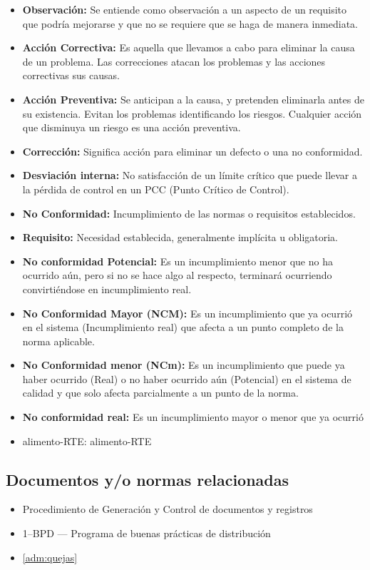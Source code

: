\begin{itemize}
	\item \textbf{Observación:} Se entiende como observación a un aspecto de un requisito que podría mejorarse y que no se requiere que se haga de manera inmediata.
	\item \textbf{Acción Correctiva:} Es aquella que llevamos a cabo para eliminar la causa de un problema. Las correcciones atacan los problemas y las acciones correctivas sus causas.
	\item \textbf{Acción Preventiva:} Se anticipan a la causa, y pretenden eliminarla antes de su existencia. Evitan los problemas identificando los riesgos. Cualquier acción que disminuya un riesgo es una acción preventiva.
	\item \textbf{Corrección:} Significa acción para eliminar un defecto o una no conformidad.
	\item \textbf{Desviación interna:} No satisfacción de un límite crítico que puede llevar a la pérdida de control en un PCC (Punto Crítico de Control).
	\item \textbf{No Conformidad:} Incumplimiento de las normas o requisitos establecidos.
	\item \textbf{Requisito:} Necesidad establecida, generalmente implícita u obligatoria.
	\item \textbf{No conformidad Potencial:} Es un incumplimiento menor que no ha ocurrido aún, pero si no se hace algo al respecto, terminará ocurriendo convirtiéndose en incumplimiento real.
	\item \textbf{No Conformidad Mayor (NCM):} Es un incumplimiento que ya ocurrió en el sistema (Incumplimiento real) que afecta a un punto completo de la norma aplicable.
	\item \textbf{No Conformidad menor (NCm):} Es un incumplimiento que puede ya haber ocurrido (Real) o no haber ocurrido aún (Potencial) en el sistema de calidad y que solo afecta parcialmente a un punto de la norma.
	\item \textbf{No conformidad real:} Es un incumplimiento mayor o menor que ya ocurrió
	\item \gls{alimento-RTE}: \glsdesc{alimento-RTE}
\end{itemize}

\subsection{Documentos y/o normas relacionadas}

\begin{itemize}
	\item Procedimiento de Generación y Control de documentos y registros %
	\item 1--BPD --- Programa de buenas prácticas de distribución
	\item \cref{adm:quejas}
\end{itemize}

